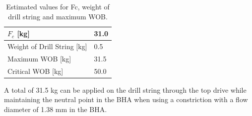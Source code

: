 \begin{table} [H]
    \centering
    \caption{Estimated values for Fc, weight of drill string and maximum WOB.}
    \begin{tabular}{p{5cm} p{2cm}}
        $F_c$ [kg] & 31.0 \\ \hline
        Weight of Drill String [kg] & 0.5 \\ \hline
        Maximum WOB [kg] & 31.5 \\ \hline
        Critical WOB [kg] & 50.0 \\ \hline
    \end{tabular}
    \label{tab:summarywob}
\end{table}

A total of 31.5 kg can be applied on the drill string through the top drive while maintaining the neutral point in the BHA when using a constriction with a flow diameter of 1.38 mm in the BHA.

